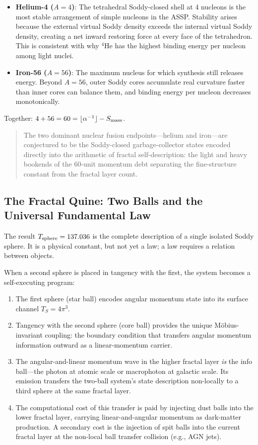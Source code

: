 \documentclass[11pt,a4paper]{article}
\begin{document}
\begin{itemize}
  \item \textbf{Helium-4 ($A = 4$)}: The tetrahedral Soddy-closed shell at 4 nucleons is the most stable arrangement of simple nucleons in the ASSP. Stability arises because the external virtual Soddy density exceeds the internal virtual Soddy density, creating a net inward restoring force at every face of the tetrahedron. This is consistent with why $^4$He has the highest binding energy per nucleon among light nuclei.
  \item \textbf{Iron-56 ($A = 56$)}: The maximum nucleus for which synthesis still releases energy. Beyond $A = 56$, outer Soddy cores accumulate real curvature faster than inner cores can balance them, and binding energy per nucleon decreases monotonically.
\end{itemize}

Together: $4 + 56 = 60 = \lfloor\alpha^{-1}\rfloor - S_{\rm mass}$.

\begin{quote}
The two dominant nuclear fusion endpoints---helium and iron---are conjectured to be the Soddy-closed garbage-collector states encoded directly into the arithmetic of fractal self-description: the light and heavy bookends of the 60-unit momentum debt separating the fine-structure constant from the fractal layer count.
\end{quote}

\subsection{The Fractal Quine: Two Balls and the Universal Fundamental Law}
\label{sec:quine}

The result $T_{\rm sphere} = 137.036$ is the complete description of a single isolated Soddy sphere. It is a physical constant, but not yet a law; a law requires a relation between objects.

When a second sphere is placed in tangency with the first, the system becomes a self-executing program:

\begin{enumerate}
  \item The first sphere (star ball) encodes angular momentum state into its surface channel $T_S = 4\pi^3$.
  \item Tangency with the second sphere (core ball) provides the unique Möbius-invariant coupling: the boundary condition that transfers angular momentum information outward as a linear-momentum carrier.
  \item The angular-and-linear momentum wave in the higher fractal layer \emph{is} the info ball---the photon at atomic scale or macrophoton at galactic scale. Its emission transfers the two-ball system's state description non-locally to a third sphere at the same fractal layer.
  \item The computational cost of this transfer is paid by injecting dust balls into the lower fractal layer, carrying linear-and-angular momentum as dark-matter production. A secondary cost is the injection of spit balls into the current fractal layer at the non-local ball transfer collision (e.g., AGN jets).
\end{enumerate}
\end{document}
